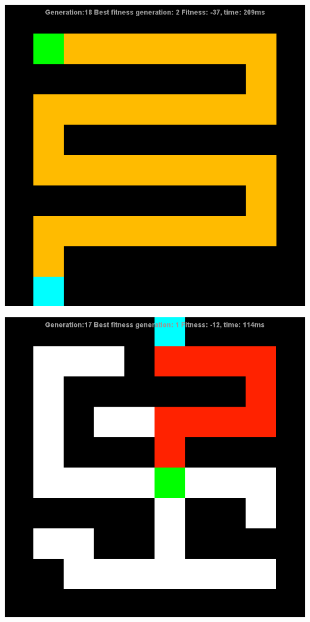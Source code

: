 \documentclass[12pt]{article} %
\begin{document}
\begin{center}
\includegraphics[scale=.6]{maze3}

\includegraphics[scale=.6]{maze4}


\end{center}
\end{document}
